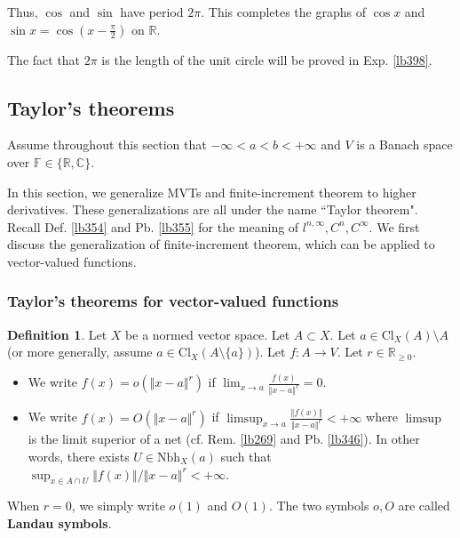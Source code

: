 \documentclass[12pt,b5paper,notitlepage]{article}
\theoremstyle{definition}
\newtheorem{df}{Definition}[section]
\theoremstyle{plain}
\newcommand{\Cbb}{\mathbb C}
\newcommand{\Rbb}{\mathbb R}
\newcommand{\Fbb}{\mathbb F}
\newcommand{\dps}{\displaystyle}
\newcommand{\Nbh}{\mathrm{Nbh}}
\newcommand{\Cl}{\mathrm{Cl}}
\numberwithin{equation}{section}
\begin{document}
Thus, $\cos$ and $\sin$ have period $2\pi$. This completes the graphs of $\cos x$ and $\sin x=\cos(x-\frac\pi2)$ on $\Rbb$.

The fact that $2\pi$ is the length of the unit circle will be proved in Exp. \ref{lb398}.



\subsection{Taylor's theorems}


Assume throughout this section that $-\infty<a<b<+\infty$ and $V$ is a Banach space over $\Fbb\in\{\Rbb,\Cbb\}$.


In this section, we generalize MVTs and finite-increment theorem to higher derivatives. These generalizations are all under the name ``Taylor theorem". Recall Def. \ref{lb354} and Pb. \ref{lb355} for the meaning of $l^{n,\infty},C^n,C^\infty$. We first discuss the generalization of finite-increment theorem, which can be applied to vector-valued functions.





 
\subsubsection{Taylor's theorems for vector-valued functions}



\begin{df}\label{lb574}
Let $X$ be a normed vector space. Let $A\subset X$. Let $a\in\Cl_X(A)\setminus A$ (or more generally, assume $a\in\Cl_X(A\setminus \{a\})$). Let $f:A\rightarrow V$. Let $r\in\Rbb_{\geq0}$.
\begin{itemize}
\item We write $\dps f(x)=o(\Vert x-a\Vert^r)$ if $\dps\lim_{x\rightarrow a}\frac{f(x)}{\Vert x-a\Vert^r}=0$.
\item We write $\dps f(x)=O(\Vert x-a\Vert^r)$ if $\dps\limsup_{x\rightarrow a}\frac{\Vert f(x)\Vert}{\Vert x-a\Vert^r}<+\infty$ where $\limsup$ is the limit superior of a net (cf. Rem. \ref{lb269} and Pb. \ref{lb346}). In other words, there exists $U\in\Nbh_X(a)$ such that $\sup_{x\in A\cap U}\Vert f(x)\Vert/\Vert x-a\Vert^r<+\infty$.
\end{itemize}
When $r=0$, we simply write $o(1)$ and $O(1)$. The two symbols $o,O$ are called \textbf{Landau symbols}. 
\end{df}
\end{document}
